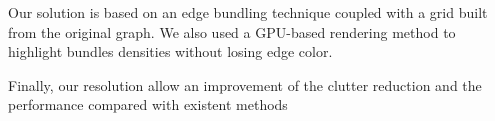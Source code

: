 Our solution is based on an edge bundling technique coupled with a grid built from the original graph. We also used a GPU-based rendering method to highlight bundles densities without losing edge color.

Finally, our resolution allow an improvement of the clutter reduction and the performance compared with existent methods 